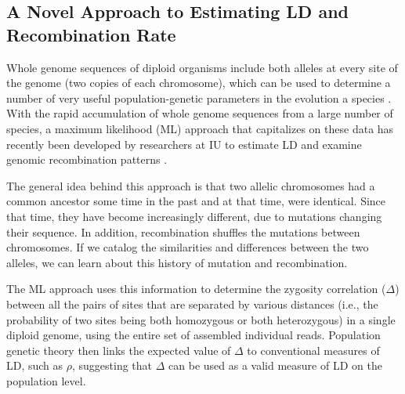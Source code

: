 \documentclass{sig-alternate}
\begin{document}
\subsection{ A Novel Approach to Estimating LD and Recombination Rate}\label{sec:migration}
Whole genome sequences of diploid organisms include both alleles at every site of the genome (two copies of
each chromosome), which can be used to determine a number of very useful population-genetic parameters in the
evolution a species \cite{LDS}. With the rapid accumulation of whole genome sequences from a large number of species, a
maximum likelihood (ML) approach that capitalizes on these data has recently been developed by researchers at
IU to estimate LD and examine genomic recombination patterns \cite{Lynch01112008,MEC:MEC4482}.

The general idea behind this approach is that two allelic chromosomes had a common ancestor some time in the
past and at that time, were
identical. Since that time, they have become 
increasingly different, due to mutations changing their sequence. In 
addition, recombination shuffles the mutations between chromosomes. If we catalog the similarities and
differences between the two alleles, we can learn about this history of mutation and recombination.

The ML approach uses this information to determine the zygosity correlation ($\Delta$) between all the pairs
of sites that are separated by various distances (i.e., the probability of two sites being both homozygous or
both heterozygous) in a single diploid genome, using the entire set of assembled individual reads. Population genetic
theory then links the expected value of $\Delta$ to conventional measures of LD, such as $\rho$, suggesting
that $\Delta$ can be used as a valid measure of LD on the population level.



\end{document}
